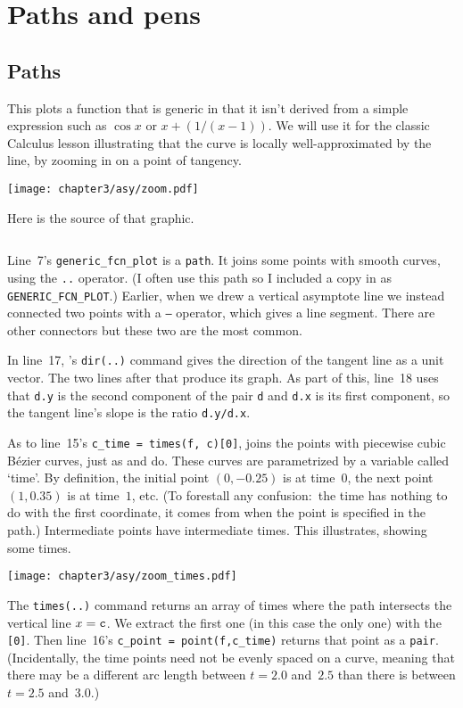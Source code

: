 \chapter{Paths and pens}

\section{Paths}
This plots a function that is generic in that it isn't 
derived from a simple expression such as $\cos x$ or $x+(1/(x-1))$.
We will use it for the classic Calculus 
lesson
illustrating that
the curve is locally well-approximated by the line,
by zooming in on a point of tangency.
\begin{center}
  \texttt{[image: chapter3/asy/zoom.pdf]}
\end{center}
Here is the source of that graphic.
\begin{center}
  \inputminted{Asymptote}{chapter3/asy/zoom.asy}
\end{center}
Line~7's \texttt{generic_fcn_plot} is a 
\texttt{path}.
It joins some points 
with smooth curves, using the \texttt{..} operator.
(I often use this path
so I included a copy in 
as \texttt{GENERIC_FCN_PLOT}.)
Earlier, when we drew a vertical asymptote line we instead connected two
points with a \texttt{--} operator, which gives a line segment.
There are other connectors but these two are the most common.

In line~17, \Asy's 
\texttt{dir(..)} command gives the direction of the
tangent line as a unit vector.
The two lines after that produce its graph.
As part of this, line~18 uses that \texttt{d.y} is the second
component of the pair \texttt{d} 
and \texttt{d.x} is its first component,
so the tangent line's slope is the ratio 
\texttt{d.y/d.x}.

As to line~15's \texttt{c_time = times(f, c)[0]}, 
\Asy{} joins the points with piecewise cubic Bézier curves,
just as \MF{} and \MP{} do. 
These curves are
parametrized by a variable called `time'.
By definition, the initial point $(0,-0.25)$ is at time~$0$, the next point 
$(1,0.35)$ is at time~$1$, etc.
(To forestall any confusion:~the time has nothing to do with the
first coordinate, it comes from when the point is specified in the
path.)
Intermediate points have intermediate times.
This illustrates, showing some times.
\begin{center}
  \texttt{[image: chapter3/asy/zoom\_times.pdf]}
\end{center}
The \texttt{times(..)} command returns an array of times
where the path intersects the vertical line 
$x=\text{\texttt{c}}$.
We extract the first one (in this case the only one) with the 
\texttt{[0]}.
Then line~16's \texttt{c_point = point(f,c_time)} returns
that point as a \texttt{pair}.
(Incidentally, the time points need not be evenly spaced on a curve, meaning that
there may be a different arc length between $t=2.0$ and~$2.5$ than there is 
between $t=2.5$ and~$3.0$.)

